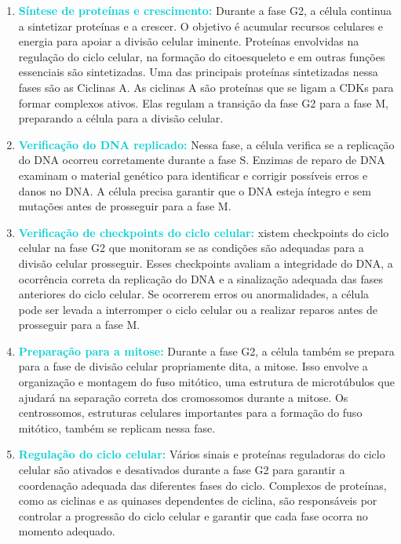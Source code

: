 \documentclass[11pt,a4paper]{article}
\begin{document}
	\begin{enumerate}
		\item \textcolor{DarkTurquoise}{\textbf{Síntese de proteínas e crescimento:}} Durante a fase G2, a célula continua a sintetizar proteínas e a crescer. O objetivo é acumular recursos celulares e energia para apoiar a divisão celular iminente. Proteínas envolvidas na regulação do ciclo celular, na formação do citoesqueleto e em outras funções essenciais são sintetizadas. Uma das principais proteínas sintetizadas nessa fases são as Ciclinas A. As ciclinas A são proteínas que se ligam a CDKs para formar complexos ativos. Elas regulam a transição da fase G2 para a fase M, preparando a célula para a divisão celular.
		\item \textcolor{DarkTurquoise}{\textbf{Verificação do DNA replicado:}} Nessa fase, a célula verifica se a replicação do DNA ocorreu corretamente durante a fase S. Enzimas de reparo de DNA examinam o material genético para identificar e corrigir possíveis erros e danos no DNA. A célula precisa garantir que o DNA esteja íntegro e sem mutações antes de prosseguir para a fase M.
		\item \textcolor{DarkTurquoise}{\textbf{Verificação de checkpoints do ciclo celular:}} xistem checkpoints do ciclo celular na fase G2 que monitoram se as condições são adequadas para a divisão celular prosseguir. Esses checkpoints avaliam a integridade do DNA, a ocorrência correta da replicação do DNA e a sinalização adequada das fases anteriores do ciclo celular. Se ocorrerem erros ou anormalidades, a célula pode ser levada a interromper o ciclo celular ou a realizar reparos antes de prosseguir para a fase M.
		\item \textcolor{DarkTurquoise}{\textbf{Preparação para a mitose:}} Durante a fase G2, a célula também se prepara para a fase de divisão celular propriamente dita, a mitose. Isso envolve a organização e montagem do fuso mitótico, uma estrutura de microtúbulos que ajudará na separação correta dos cromossomos durante a mitose. Os centrossomos, estruturas celulares importantes para a formação do fuso mitótico, também se replicam nessa fase.
		\item \textcolor{DarkTurquoise}{\textbf{Regulação do ciclo celular:}} Vários sinais e proteínas reguladoras do ciclo celular são ativados e desativados durante a fase G2 para garantir a coordenação adequada das diferentes fases do ciclo. Complexos de proteínas, como as ciclinas e as quinases dependentes de ciclina, são responsáveis por controlar a progressão do ciclo celular e garantir que cada fase ocorra no momento adequado.
	\end{enumerate}
\end{document}
